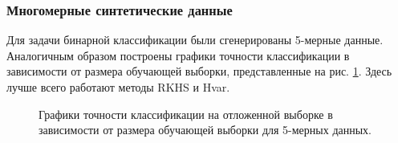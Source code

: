 \documentclass{llncs}
\begin{document}
\subsubsection{Многомерные синтетические данные} Для задачи бинарной классификации были сгенерированы 5-мерные данные. Аналогичным образом построены графики точности классификации в зависимости от размера обучающей выборки, представленные на рис. \ref{acc5dim}. Здесь лучше всего работают методы RKHS и Hvar.
\begin{figure}[h]
\vspace{0 cm}
\caption{Графики точности классификации на отложенной выборке в зависимости от размера обучающей выборки для 5-мерных данных.}
\label{acc5dim}
\end{figure}

\end{document}
